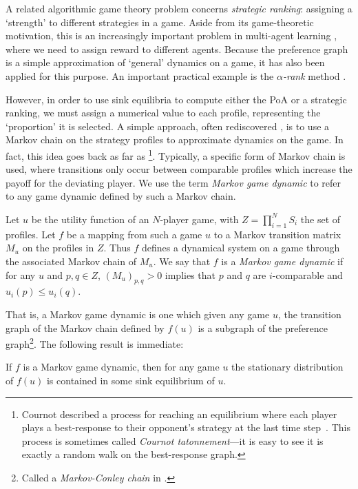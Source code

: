 \documentclass[preprint,authoryear]{elsarticle}
\begin{document}
A related algorithmic game theory problem concerns \emph{strategic ranking}: assigning a `strength' to different strategies in a game. Aside from its game-theoretic motivation, this is an increasingly important problem in multi-agent learning \citep{balduzzi_re-evaluating_2018}, where we need to assign reward to different agents. Because the preference graph is a simple approximation of `general' dynamics on a game, it has also been applied for this purpose. An important practical example is the \emph{$\alpha$-rank} method \citep{omidshafiei_-rank_2019}.


However, in order to use sink equilibria to compute either the PoA or a strategic ranking, we must assign a numerical value to each profile, representing the `proportion' it is selected. A simple approach, often rediscovered \citep{papadimitriou_game_2019,goemans_sink_2005,young_evolution_1993,fabrikant2008complexity,omidshafiei_-rank_2019,hakim2024swim}, is to use a Markov chain on the strategy profiles to approximate dynamics on the game. In fact, this idea goes back as far as \cite{cournot1838recherches}\footnote{Cournot described a process for reaching an equilibrium where each player plays a best-response to their opponent's strategy at the last time step~\citep{moulin_dominance_1984}. This process is sometimes called \emph{Cournot tatonnement}---it is easy to see it is exactly a random walk on the best-response graph.}. Typically, a specific form of Markov chain is used, where transitions only occur between comparable profiles which increase the payoff for the deviating player. We use the term \emph{Markov game dynamic} to refer to any game dynamic defined by such a Markov chain.
\begin{defn}
    Let $u$ be the utility function of an $N$-player game, with $Z = \prod_{i=1}^N S_i$ the set of profiles. Let $f$ be a mapping from such a game $u$ to a Markov transition matrix $M_u$ on the profiles in $Z$. Thus $f$ defines a dynamical system on a game through the associated Markov chain of $M_u$. We say that $f$ is a \emph{Markov game dynamic} if for any $u$ and $p,q\in Z$, $(M_u)_{p,q} > 0$ implies that $p$ and $q$ are $i$-comparable and $u_i(p) \leq u_i(q)$.
\end{defn}
That is, a Markov game dynamic is one which given any game $u$, the transition graph of the Markov chain defined by $f(u)$ is a subgraph of the preference graph\footnote{Called a \emph{Markov-Conley chain} in \cite{papadimitriou_game_2019}.}. The following result is immediate:
\begin{lem} \label{lem: stationary distributions}
    If $f$ is a Markov game dynamic, then for any game $u$ the stationary distribution of $f(u)$ is contained in some sink equilibrium of $u$.
\end{lem}
\end{document}
